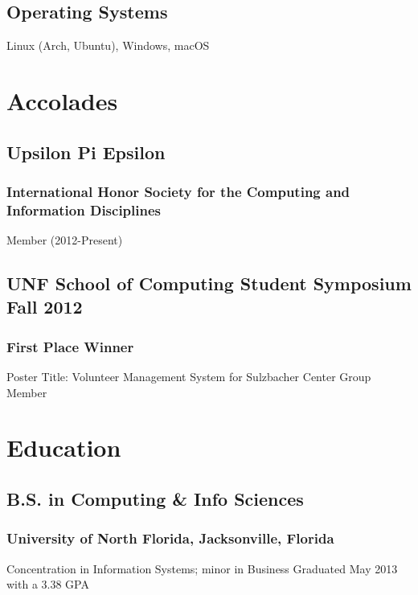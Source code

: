 \documentclass{article}
\begin{document}
\subsection{Operating Systems}
Linux (Arch, Ubuntu), Windows, macOS


\section{Accolades}
\subsection{Upsilon Pi Epsilon}
\subsubsection{International Honor Society for the Computing and Information Disciplines}
Member (2012-Present)

\subsection{UNF School of Computing Student Symposium Fall 2012}
\subsubsection{First Place Winner}
Poster Title: Volunteer Management System for Sulzbacher Center
Group Member

\section{Education}
\subsection{B.S. in Computing \& Info Sciences}
\subsubsection{University of North Florida, Jacksonville, Florida}
Concentration in Information Systems; minor in Business
Graduated May 2013 with a 3.38 GPA
\end{document}
